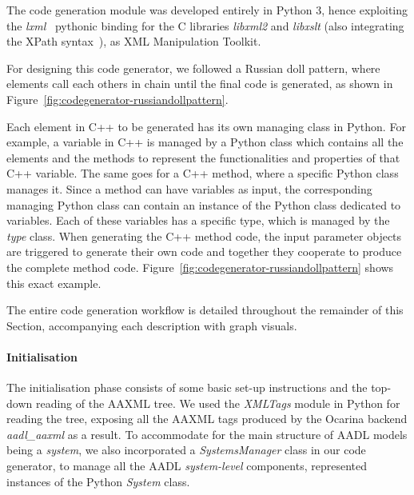 The code generation module was developed entirely in Python 3, hence exploiting the \textit{lxml}~\cite{lxml} pythonic binding for the C libraries \textit{libxml2} and \textit{libxslt} (also integrating the XPath syntax~\cite{websiteXPath}), as XML Manipulation Toolkit.

For designing this code generator, we followed a Russian doll pattern, where elements call each others in chain until the final code is generated, as shown in Figure~\ref{fig:codegenerator-russiandollpattern}.

Each element in C++ to be generated has its own managing class in Python. For example, a variable in C++ is managed by a Python class which contains all the elements and the methods to represent the functionalities and properties of that C++ variable. The same goes for a C++ method, where a specific Python class manages it. Since a method can have variables as input, the corresponding managing Python class can contain an instance of the Python class dedicated to variables. Each of these variables has a specific type, which is managed by the \textit{type} class. When generating the C++ method code, the input parameter objects are triggered to generate their own code and together they cooperate to produce the complete method code.  Figure~\ref{fig:codegenerator-russiandollpattern} shows this exact example.

The entire code generation workflow is detailed throughout the remainder of this Section, accompanying each description with graph visuals.

\paragraph{Initialisation} The initialisation phase consists of some basic set-up instructions and the top-down reading of the AAXML tree. We used the \textit{XMLTags} module in Python for reading the tree, exposing all the AAXML tags produced by the Ocarina backend \textit{aadl\_aaxml} as a result. %
To accommodate for the main structure of AADL models being a \textit{system}, we also incorporated a \textit{SystemsManager} class in our code generator, to manage all the AADL \textit{system-level} components, represented instances of the Python \textit{System} class.

